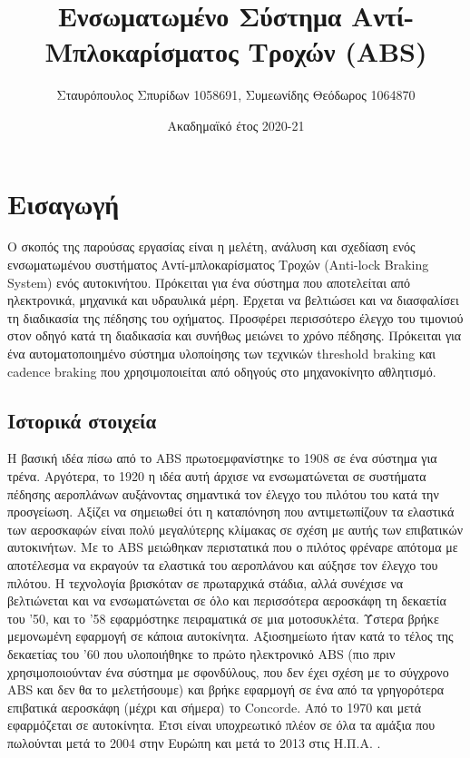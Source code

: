 \documentclass{article}
\title{Ενσωματωμένο Σύστημα Αντί-Mπλοκαρίσματος Τροχών (ABS)}
\author{Σταυρόπουλος Σπυρίδων 1058691, Συμεωνίδης Θεόδωρος 1064870}
\date{Ακαδημαϊκό έτος 2020-21}
\begin{document}
\maketitle

\newpage

\tableofcontents

\newpage 

\section{Εισαγωγή}
 Ο σκοπός της παρούσας εργασίας είναι η μελέτη, ανάλυση και σχεδίαση ενός ενσωματωμένου συστήματος Αντί-μπλοκαρίσματος Τροχών (Anti-lock Braking System) ενός αυτοκινήτου. Πρόκειται για ένα σύστημα που αποτελείται από ηλεκτρονικά, μηχανικά και υδραυλικά μέρη. Έρχεται να βελτιώσει και να διασφαλίσει τη διαδικασία της πέδησης του οχήματος. Προσφέρει περισσότερο έλεγχο του τιμονιού στον οδηγό κατά τη διαδικασία και συνήθως μειώνει το χρόνο πέδησης. Πρόκειται για ένα αυτοματοποιημένο σύστημα υλοποίησης των τεχνικών threshold braking και cadence braking που χρησιμοποιείται από οδηγούς στο μηχανοκίνητο αθλητισμό.

\subsection{Ιστορικά στοιχεία}
Η βασική ιδέα πίσω από το ABS πρωτοεμφανίστηκε το 1908 σε ένα σύστημα για τρένα. Αργότερα, το 1920 η ιδέα αυτή άρχισε να ενσωματώνεται σε συστήματα πέδησης αεροπλάνων αυξάνοντας σημαντικά τον έλεγχο του πιλότου του κατά την προσγείωση. Αξίζει να σημειωθεί ότι η καταπόνηση που αντιμετωπίζουν τα ελαστικά των αεροσκαφών είναι πολύ μεγαλύτερης κλίμακας σε σχέση με αυτής των επιβατικών αυτοκινήτων. Με το ABS μειώθηκαν περιστατικά που ο πιλότος φρέναρε απότομα με αποτέλεσμα να εκραγούν τα ελαστικά του αεροπλάνου και αύξησε τον έλεγχο του πιλότου. Η τεχνολογία βρισκόταν σε πρωταρχικά στάδια, αλλά συνέχισε να βελτιώνεται και να ενσωματώνεται σε όλο και περισσότερα αεροσκάφη τη δεκαετία του ’50, και το ’58 εφαρμόστηκε πειραματικά σε μια μοτοσυκλέτα. Ύστερα βρήκε μεμονωμένη εφαρμογή σε κάποια αυτοκίνητα. Αξιοσημείωτο ήταν κατά το τέλος της δεκαετίας του ’60 που υλοποιήθηκε το πρώτο ηλεκτρονικό ABS (πιο πριν χρησιμοποιούνταν ένα σύστημα με σφονδύλους, που δεν έχει σχέση με το σύγχρονο ABS και δεν θα το μελετήσουμε) και βρήκε εφαρμογή σε ένα από τα γρηγορότερα επιβατικά αεροσκάφη (μέχρι και σήμερα) το Concorde. Από το 1970 και μετά εφαρμόζεται σε αυτοκίνητα. Έτσι είναι υποχρεωτικό πλέον σε όλα τα αμάξια που πωλούνται μετά το 2004 στην Ευρώπη και μετά το 2013 στις Η.Π.Α. .
\end{document}
